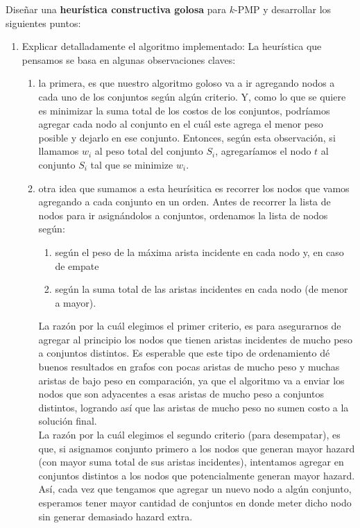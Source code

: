 \documentclass[11pt, a4paper, twoside]{article}
\begin{document}
	Diseñar una \textbf{heurística constructiva golosa} para $k$-PMP y desarrollar los siguientes puntos:
    
    \begin{enumerate}
		\item Explicar detalladamente el algoritmo implementado:
		La heurística que pensamos se basa en algunas observaciones claves: 
		\begin{enumerate}
			\item la primera, es que nuestro
			algoritmo goloso va a ir agregando nodos a cada uno de los conjuntos según algún criterio. Y,
			como lo que se quiere es minimizar la suma total de los costos de los conjuntos, podríamos agregar
			cada nodo al conjunto en el cuál este agrega el menor peso posible y dejarlo en ese conjunto. 
			Entonces, según esta observación,
			si llamamos $w_{i}$ al peso total del conjunto $S_{i}$, 
			agregaríamos el nodo $t$ al conjunto $S_{i}$ tal que se minimize $w_{i}$.
						
			\item otra idea que sumamos a esta heurísitica es recorrer los nodos que vamos agregando a
			cada conjunto en un orden. Antes de recorrer la lista de nodos para ir asignándolos a conjuntos,
			ordenamos la lista de nodos según: 
			\begin{enumerate}
				\item según el peso de la máxima arista incidente en cada nodo y, en caso de empate
				\item según la suma total de las aristas incidentes en cada nodo (de menor a mayor).
			\end{enumerate}
			La razón por la cuál elegimos el primer criterio, es para asegurarnos de agregar al principio los nodos
			que tienen aristas incidentes de mucho peso a conjuntos distintos.
			Es esperable que este tipo de ordenamiento dé buenos resultados en grafos con pocas aristas de mucho
			peso y muchas aristas de bajo peso en comparación, ya que el algoritmo va a enviar los nodos 
			que son adyacentes a esas aristas de mucho peso a conjuntos distintos, logrando así que las aristas de
			mucho peso no sumen costo a la solución final. \\
			La razón por la cuál elegimos el segundo criterio (para desempatar), es que, si asignamos conjunto
			primero a los nodos que generan mayor hazard (con mayor suma total de sus aristas incidentes), intentamos
			agregar en conjuntos distintos a los nodos que potencialmente generan mayor hazard. Así, cada vez que 
			tengamos que agregar un nuevo nodo a algún conjunto, esperamos tener mayor cantidad de conjuntos en donde 
			meter dicho nodo sin generar demasiado hazard extra. \\
			

\end{enumerate}
\end{enumerate}
\end{document}
